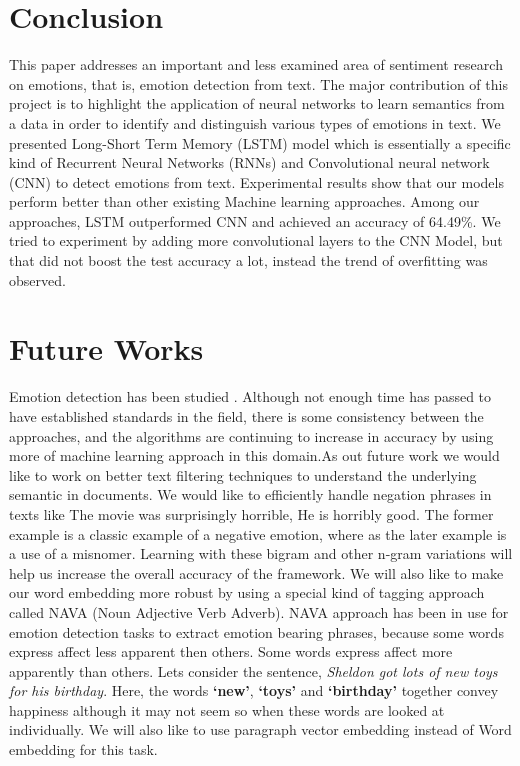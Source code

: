 \documentclass[conference]{IEEEtran}
\numberwithin{equation}{section}
\numberwithin{figure}{section}
\numberwithin{table}{section}
\begin{document}
\section{Conclusion}
This paper addresses an important and less examined area of sentiment research on emotions, that is, emotion detection from text. The major contribution of this project is to highlight the application of neural networks to learn semantics from a data in order to identify and distinguish various types of emotions in text. We presented Long-Short Term Memory (LSTM) model which is essentially a specific kind of Recurrent Neural Networks (RNNs) and Convolutional neural network (CNN) to detect emotions from text. Experimental results show that our models perform better than other existing Machine learning approaches. Among our approaches, LSTM outperformed CNN and achieved an accuracy of 64.49\%. We tried to experiment by adding more convolutional layers to the CNN Model, but that did not boost the test accuracy a lot, instead the trend of overfitting was observed.

\section{Future Works}
Emotion detection has been studied . Although not enough time has passed to have established standards in the field, there is some consistency between the approaches, and the algorithms are continuing to increase in accuracy by using more of machine learning approach in this domain.As out future work we would like to work on better text filtering techniques to understand the underlying semantic in documents. We would like to efficiently handle negation phrases in texts like The movie was surprisingly horrible, He is horribly good. The former example is a classic example of a negative emotion, where as the later example is a use of a misnomer. Learning with these bigram and other n-gram variations will help us increase the overall accuracy of the framework. We will also like to make our word embedding more robust by using a special kind of tagging approach called NAVA (Noun Adjective Verb Adverb). NAVA approach has been in use for emotion detection tasks to extract emotion bearing phrases, because some words express affect less apparent then others. Some words express affect more apparently than others. Lets consider the sentence, \textit{Sheldon got lots of new toys for his birthday}. Here, the words \textbf{‘new’}, \textbf{‘toys’} and \textbf{‘birthday’} together convey happiness although it may not seem so when these words are looked at individually. We will also like to use paragraph vector embedding instead of Word embedding for this task. 
\end{document}
